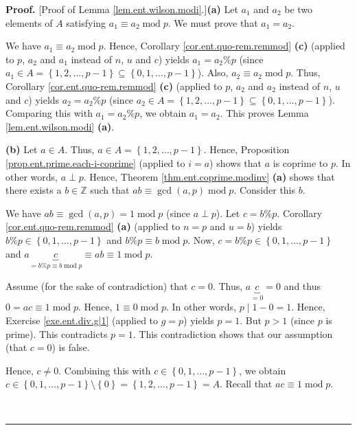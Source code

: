 \documentclass[numbers=enddot,12pt,final,onecolumn,notitlepage]{scrartcl}%
\numberwithin{exer}{subsection}
\theoremstyle{definition}
\newenvironment{proof}[1][Proof]{\noindent\textbf{#1.} }{\ \rule{0.5em}{0.5em}}
\begin{document}
\begin{proof}
[Proof of Lemma \ref{lem.ent.wilson.modi}.]\textbf{(a)} Let $a_{1}$ and
$a_{2}$ be two elements of $A$ satisfying $a_{1}\equiv a_{2}\operatorname{mod}%
p$. We must prove that $a_{1}=a_{2}$.

We have $a_{1}\equiv a_{2}\operatorname{mod}p$. Hence, Corollary
\ref{cor.ent.quo-rem.remmod} \textbf{(c)} (applied to $p$, $a_{2}$ and $a_{1}$
instead of $n$, $u$ and $c$) yields $a_{1}=a_{2}\%p$ (since $a_{1}\in
A=\left\{  1,2,\ldots,p-1\right\}  \subseteq\left\{  0,1,\ldots,p-1\right\}
$). Also, $a_{2}\equiv a_{2}\operatorname{mod}p$. Thus, Corollary
\ref{cor.ent.quo-rem.remmod} \textbf{(c)} (applied to $p$, $a_{2}$ and $a_{2}$
instead of $n$, $u$ and $c$) yields $a_{2}=a_{2}\%p$ (since $a_{2}\in
A=\left\{  1,2,\ldots,p-1\right\}  \subseteq\left\{  0,1,\ldots,p-1\right\}
$). Comparing this with $a_{1}=a_{2}\%p$, we obtain $a_{1}=a_{2}$. This proves
Lemma \ref{lem.ent.wilson.modi} \textbf{(a)}.

\textbf{(b)} Let $a\in A$. Thus, $a\in A=\left\{  1,2,\ldots,p-1\right\}  $.
Hence, Proposition \ref{prop.ent.prime.each-i-coprime} (applied to $i=a$)
shows that $a$ is coprime to $p$. In other words, $a\perp p$. Hence, Theorem
\ref{thm.ent.coprime.modinv} \textbf{(a)} shows that there exists a
$b\in\mathbb{Z}$ such that $ab\equiv\gcd\left(  a,p\right)  \operatorname{mod}%
p$. Consider this $b$.

We have $ab\equiv\gcd\left(  a,p\right)  =1\operatorname{mod}p$ (since $a\perp
p$). Let $c=b\%p$. Corollary \ref{cor.ent.quo-rem.remmod} \textbf{(a)}
(applied to $n=p$ and $u=b$) yields $b\%p\in\left\{  0,1,\ldots,p-1\right\}  $
and $b\%p\equiv b\operatorname{mod}p$. Now, $c=b\%p\in\left\{  0,1,\ldots
,p-1\right\}  $ and $a\underbrace{c}_{=b\%p\equiv b\operatorname{mod}p}\equiv
ab\equiv1\operatorname{mod}p$.

Assume (for the sake of contradiction) that $c=0$. Thus, $a\underbrace{c}%
_{=0}=0$ and thus $0=ac\equiv1\operatorname{mod}p$. Hence, $1\equiv
0\operatorname{mod}p$. In other words, $p\mid1-0=1$. Hence, Exercise
\ref{exe.ent.div.g|1} (applied to $g=p$) yields $p=1$. But $p>1$ (since $p$ is
prime). This contradicts $p=1$. This contradiction shows that our assumption
(that $c=0$) is false.

Hence, $c\neq0$. Combining this with $c\in\left\{  0,1,\ldots,p-1\right\}  $,
we obtain $c\in\left\{  0,1,\ldots,p-1\right\}  \setminus\left\{  0\right\}
=\left\{  1,2,\ldots,p-1\right\}  =A$. Recall that $ac\equiv
1\operatorname{mod}p$.


\end{proof}
\end{document}
